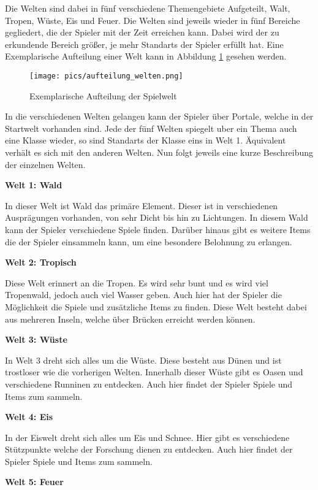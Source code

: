 Die Welten sind dabei in fünf verschiedene Themengebiete Aufgeteilt, Walt, Tropen, Wüste, Eis und Feuer.
Die Welten sind jeweils wieder in fünf Bereiche gegliedert, die der Spieler mit der Zeit erreichen kann. Dabei wird der zu erkundende Bereich größer, je mehr Standarts der Spieler erfüllt hat. Eine Exemplarische Aufteilung einer Welt kann in Abbildung \ref{aufteilung_welten} gesehen werden.

\begin{figure}[htbp]
\centering 
\label{aufteilung_welten}
\texttt{[image: pics/aufteilung\_welten.png]}
\caption{Exemplarische Aufteilung der Spielwelt}
\end{figure}

In die verschiedenen Welten gelangen kann der Spieler über Portale, welche in der Startwelt vorhanden sind.
Jede der fünf Welten spiegelt uber ein Thema auch eine Klasse wieder, so sind Standarts der Klasse eins in Welt 1. Äquivalent verhält es sich mit den anderen Welten. Nun folgt jeweils eine kurze Beschreibung der einzelnen Welten.

\textbf{Welt 1: Wald}

In dieser Welt ist Wald das primäre Element. Dieser ist in verschiedenen Ausprägungen vorhanden, von sehr Dicht bis hin zu Lichtungen. In diesem Wald kann der Spieler verschiedene Spiele finden. Darüber hinaus gibt es weitere Items die der Spieler einsammeln kann, um eine besondere Belohnung zu erlangen.

\textbf{Welt 2: Tropisch}

Diese Welt erinnert an die Tropen. Es wird sehr bunt und es wird viel Tropenwald, jedoch auch viel Wasser geben. Auch hier hat der Spieler die Möglichkeit die Spiele und zusätzliche Items zu finden. Diese Welt besteht dabei aus mehreren Inseln, welche über Brücken erreicht werden können.

\textbf{Welt 3: Wüste}

In Welt 3 dreht sich alles um die Wüste. Diese besteht aus Dünen und ist trostloser wie die vorherigen Welten. Innerhalb dieser Wüste gibt es Oasen und verschiedene Runninen zu entdecken. Auch hier findet der Spieler Spiele und Items zum sammeln.

\textbf{Welt 4: Eis}

In der Eiswelt dreht sich alles um Eis und Schnee. Hier gibt es verschiedene Stützpunkte welche der Forschung dienen zu entdecken. Auch hier findet der Spieler Spiele und Items zum sammeln.

\textbf{Welt 5: Feuer}

